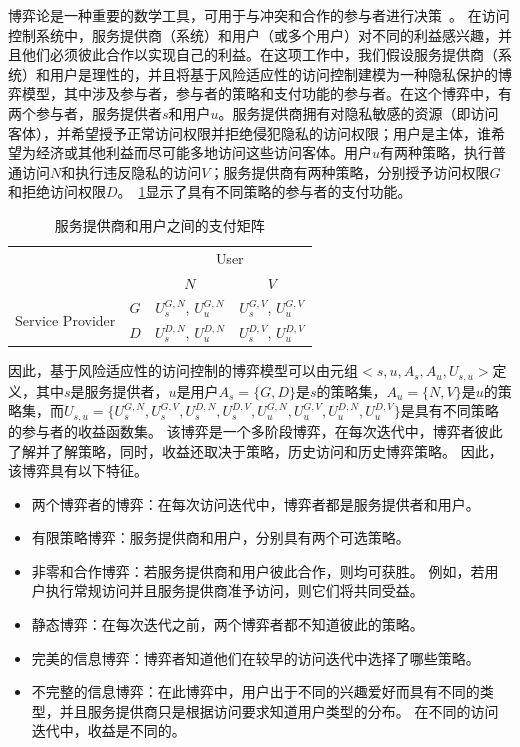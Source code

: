 博弈论是一种重要的数学工具，可用于与冲突和合作的参与者进行决策~\cite{owen2001}。
在访问控制系统中，服务提供商（系统）和用户（或多个用户）对不同的利益感兴趣，并且他们必须彼此合作以实现自己的利益。在这项工作中，我们假设服务提供商（系统）和用户是理性的，并且将基于风险适应性的访问控制建模为一种隐私保护的博弈模型，其中涉及参与者，参与者的策略和支付功能的参与者。在这个博弈中，有两个参与者，服务提供者$s$和用户$u$。服务提供商拥有对隐私敏感的资源（即访问客体），并希望授予正常访问权限并拒绝侵犯隐私的访问权限；用户是主体，谁希望为经济或其他利益而尽可能多地访问这些访问客体。用户$u$有两种策略，执行普通访问$N$和执行违反隐私的访问$V$；服务提供商有两种策略，分别授予访问权限$G$和拒绝访问权限$D$。~\ref{tab:payoff}显示了具有不同策略的参与者的支付功能。
\begin{table}[htb]
	\caption{服务提供商和用户之间的支付矩阵}\label{tab:payoff}
	\centering 
	\begin{tabular}{cccc}
		\toprule
		\multicolumn{2}{c}{\multirow{2}{*}{}} & \multicolumn{2}{c}{User} \\
		\cline{3-4}
		& & $N$ & $V$ \\	
		\hline
		\multirow{2}{*}{Service Provider} & $G$ &$U_s^{G,N}$, $U_u^{G,N}$ & $U_s^{G,V}$, $U_u^{G,V}$\\
		\cline{2-4}
		& $D$ & $U_s^{D,N}$, $U_u^{D,N}$ & $U_s^{D,V}$, $U_u^{D,V}$\\
		\toprule
	\end{tabular}
\end{table}


因此，基于风险适应性的访问控制的博弈模型可以由元组$<s,u,A_s,A_u,U_{s,u}>$定义，其中$s$是服务提供者，$u$是用户$A_s=\{G,D\}$是$s$的策略集，$A_u=\{N,V\}$是$u$的策略集，而$U_{s,u}=\{U_s^{G,N}, U_s^{G,V}, U_s^{D,N}, U_s^{D,V}, U_u^{G,N}, U_u^{G,V}, U_u^{D,N}, U_u^{D,V}\}$是具有不同策略的参与者的收益函数集。 该博弈是一个多阶段博弈，在每次迭代中，博弈者彼此了解并了解策略，同时，收益还取决于策略，历史访问和历史博弈策略。 因此，该博弈具有以下特征。
\begin{itemize}
	\item 两个博弈者的博弈：在每次访问迭代中，博弈者都是服务提供者和用户。
	\item 有限策略博弈：服务提供商和用户，分别具有两个可选策略。
	\item 非零和合作博弈：若服务提供商和用户彼此合作，则均可获胜。 例如，若用户执行常规访问并且服务提供商准予访问，则它们将共同受益。
	\item 静态博弈：在每次迭代之前，两个博弈者都不知道彼此的策略。
	\item 完美的信息博弈：博弈者知道他们在较早的访问迭代中选择了哪些策略。
	\item 不完整的信息博弈：在此博弈中，用户出于不同的兴趣爱好而具有不同的类型，并且服务提供商只是根据访问要求知道用户类型的分布。 在不同的访问迭代中，收益是不同的。
\end{itemize}

